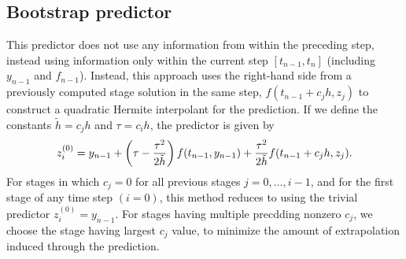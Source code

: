 \documentclass[letterpaper,10pt,english]{sphinxmanual}
\begin{document}
\subsection{Bootstrap predictor}
\label{Mathematics:mathematics-predictors-bootstrap}\label{Mathematics:bootstrap-predictor}
This predictor does not use any information from within the preceding
step, instead using information only within the current step
\([t_{n-1},t_n]\) (including \(y_{n-1}\) and
\(f_{n-1}\)).  Instead, this approach uses the right-hand side
from a previously computed stage solution in the same step,
\(f(t_{n-1}+c_j h,z_j)\) to construct a quadratic Hermite
interpolant for the prediction.  If we define the constants
\(\tilde{h} = c_j h\) and \(\tau = c_i h\), the predictor is
given by
\begin{gather}
\begin{split}z_i^{(0)} = y_{n-1} + \left(\tau - \frac{\tau^2}{2\tilde{h}}\right)
   f(t_{n-1},y_{n-1}) + \frac{\tau^2}{2\tilde{h}} f(t_{n-1}+c_j h,z_j).\end{split}\notag
\end{gather}
For stages in which \(c_j=0\) for all previous stages
\(j = 0,\ldots,i-1\), and for the first stage of any time step
\((i=0)\), this method reduces to using the trivial predictor
\(z_i^{(0)} = y_{n-1}\).  For stages having multiple precdding
nonzero \(c_j\), we choose the stage having largest \(c_j\)
value, to minimize the amount of extrapolation induced through the
prediction.
\end{document}

